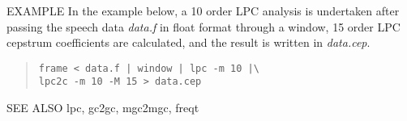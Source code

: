 \begin{options}
\end{options}

\begin{qsection}{EXAMPLE}
In the example below, a 10 order LPC analysis is undertaken after
passing the speech data {\em data.f} in float format through a window,
15 order LPC cepstrum coefficients are calculated,
and the result is written in {\em data.cep}.
\begin{quote}
 \verb!frame < data.f | window | lpc -m 10 |\!\\
 \verb!lpc2c -m 10 -M 15 > data.cep!
\end{quote}
\end{qsection}

\begin{qsection}{SEE ALSO}
lpc, gc2gc, mgc2mgc, freqt
\end{qsection}
